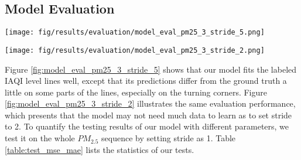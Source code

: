 \documentclass[
twocolumn,
]{ceurart}
\begin{document}
\subsection{Model Evaluation}

\begin{figure*}[!htbp]
    \centering
    \texttt{[image: fig/results/evaluation/model\_eval\_pm25\_3\_stride\_5.png]}
    \caption{Evaluation of the GreenEyes model (, stride=5).}
    \label{fig:model_eval_pm25_3_stride_5}
\end{figure*}

\begin{figure*}[!htbp]
    \centering
    \texttt{[image: fig/results/evaluation/model\_eval\_pm25\_3\_stride\_2.png]}
    \caption{Evaluation of the GreenEyes model (, stride=10).}
    \label{fig:model_eval_pm25_3_stride_2}
\end{figure*}

Figure \ref{fig:model_eval_pm25_3_stride_5} shows that our model fits the labeled IAQI level lines well, except that its predictions differ from the ground truth a little on some parts of the lines, especially on the turning corners. Figure \ref{fig:model_eval_pm25_3_stride_2} illustrates the same evaluation performance, which presents that the model may not need much data to learn as to set stride to 2.
To quantify the testing results of our model with different parameters, we test it on the whole $PM_{2.5}$ sequence by setting stride as 1. Table \ref{table:test_mse_mae} lists the statistics of our tests.

\end{document}
